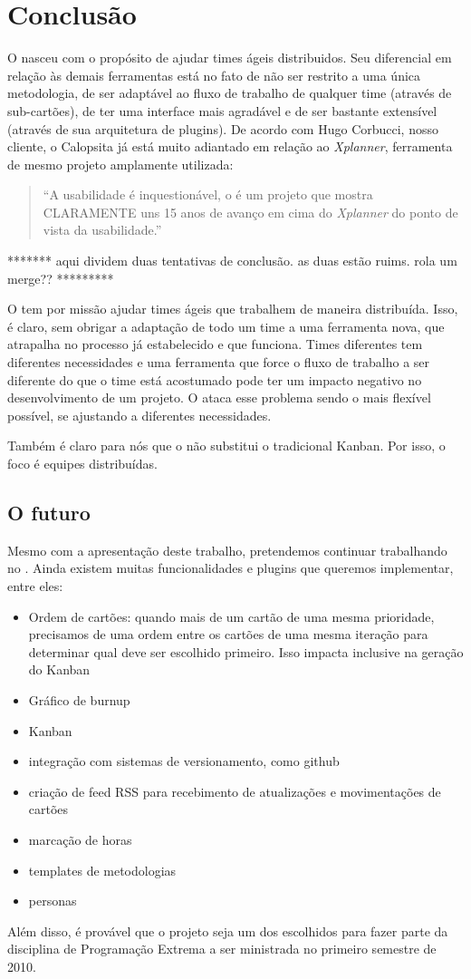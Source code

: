 \section{Conclusão}

O \calopsita{} nasceu com o propósito de ajudar times ágeis distribuidos. Seu diferencial em relação às demais ferramentas está no fato de não ser restrito a uma única metodologia, de ser adaptável ao fluxo de trabalho de qualquer time (através de sub-cartões), de ter uma interface mais agradável e de ser bastante extensível (através de sua arquitetura de plugins). De acordo com Hugo Corbucci, nosso cliente, o Calopsita já está muito adiantado em relação ao \textit{Xplanner}, ferramenta de mesmo projeto amplamente utilizada:

\begin{quote}
``A usabilidade é inquestionável, o \calopsita{} é um projeto que mostra CLARAMENTE uns 15 anos de avanço em cima do \textit{Xplanner} do ponto de vista da usabilidade.''
\end{quote}

******* aqui dividem duas tentativas de conclusão. as duas estão ruims. rola um merge?? *********

O \calopsita{} tem por missão ajudar times ágeis que trabalhem de maneira distribuída. Isso, é claro, sem obrigar
a adaptação de todo um time a uma ferramenta nova, que atrapalha no processo já estabelecido e que funciona. Times
diferentes tem diferentes necessidades e uma ferramenta que force o fluxo de trabalho a ser diferente do que o time 
está acostumado pode ter um impacto negativo no desenvolvimento de um projeto. O \calopsita{} ataca esse problema
sendo o mais flexível possível, se ajustando a diferentes necessidades.

Também é claro para nós que o \calopsita{} não substitui o tradicional Kanban. Por isso, o foco é equipes distribuídas.


\subsection{O futuro}

Mesmo com a apresentação deste trabalho, pretendemos continuar trabalhando no \calopsita{}. Ainda existem muitas funcionalidades
e plugins que queremos implementar, entre eles:

\begin{itemize}
	\item{Ordem de cartões: quando mais de um cartão de uma mesma prioridade, precisamos de uma ordem entre os cartões de uma
	mesma iteração para determinar qual deve ser escolhido primeiro. Isso impacta inclusive na geração do Kanban}
	\item{Gráfico de burnup}
	\item{Kanban}
	\item{integração com sistemas de versionamento, como github}
	\item{criação de feed RSS para recebimento de atualizações e movimentações de cartões}
	\item{marcação de horas}
	\item{templates de metodologias}
	\item{personas}
\end{itemize}

Além disso, é provável que o projeto seja um dos escolhidos para fazer parte da disciplina de Programação Extrema a ser
ministrada no primeiro semestre de 2010.